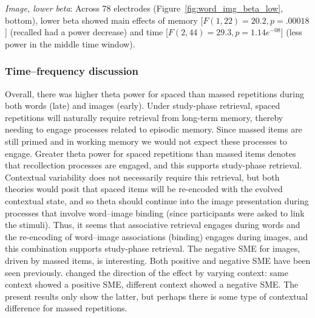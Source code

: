 \textit{Image, lower beta}: Across 78 electrodes (Figure~\ref{fig:word_img_beta_low}, bottom), lower beta showed main effects of memory [$F(1,22)=20.2, p=.00018$] (recalled had a power decrease) and time [$F(2,44)=29.3, p=1.14e^{-08}$] (less power in the middle time window).


\subsubsection{Time--frequency discussion}

Overall, there was higher theta power for spaced than massed repetitions during both words (late) and images (early).
Under study-phase retrieval, spaced repetitions will naturally require retrieval from long-term memory, thereby needing to engage processes related to episodic memory.  Since massed items are still primed and in working memory we would not expect these processes to engage.
Greater theta power for spaced repetitions than massed items denotes that recollection processes are engaged, and this supports study-phase retrieval.  Contextual variability does not necessarily require this retrieval, but both theories would posit that spaced items will be re-encoded with the evolved contextual state, and so theta should continue into the image presentation during processes that involve word--image binding (since participants were asked to link the stimuli).
\cbstart
Thus, it seems that associative retrieval engages during words and the re-encoding of word--image associations (binding) engages during images, and this combination supports study-phase retrieval.  The negative SME for images, driven by massed items, is interesting.  Both positive and negative SME have been seen previously.   changed the direction of the effect by varying context: same context showed a positive SME, different context showed a negative SME.  The present results only show the latter, but perhaps there is some type of contextual difference for massed repetitions.
\cbend


